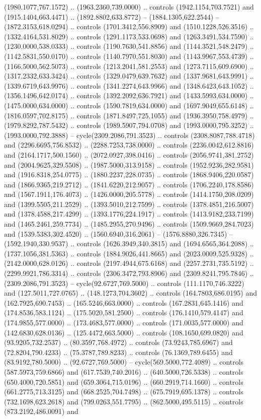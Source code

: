 (1980.1077,767.1572) .. (1963.2360,739.0000) .. controls (1942.1154,703.7521) and (1915.1404,663.4471) .. (1892.8802,633.8772) -- (1884.1305,622.2544) -- (1872.3153,618.0294) .. controls (1701.3412,556.8909) and (1510.1228,526.3516) .. (1332.4164,531.8029) .. controls (1291.1173,533.0698) and (1263.3491,534.7590) .. (1230.0000,538.0333) .. controls (1190.7630,541.8856) and (1144.3521,548.2479) .. (1142.5831,550.0170) .. controls (1140.7970,551.8030) and (1143.9967,553.4739) .. (1166.5000,562.5073) .. controls (1213.2041,581.2553) and (1273.7115,609.6900) .. (1317.2332,633.3424) .. controls (1329.0479,639.7632) and (1337.9681,643.9991) .. (1339.6719,643.9976) .. controls (1341.2274,643.9966) and (1348.6423,643.1052) .. (1356.1496,642.0174) .. controls (1392.2092,636.7921) and (1433.5993,634.0000) .. (1475.0000,634.0000) .. controls (1590.7819,634.0000) and (1697.9049,655.6148) .. (1816.0597,702.8175) .. controls (1871.8497,725.1055) and (1936.3950,758.4979) .. (1979.8292,787.5432) .. controls (1989.5907,794.0708) and (1993.0000,795.3252) .. (1993.0000,792.3888) -- cycle(2309.2086,791.3523) .. controls (2308.8087,788.4718) and (2296.6695,756.8532) .. (2288.7253,738.0000) .. controls (2236.0042,612.8816) and (2164.1717,500.1560) .. (2072.0927,398.0416) .. controls (2056.9741,381.2752) and (2004.9625,329.5508) .. (1987.5000,313.9158) .. controls (1952.9236,282.9581) and (1916.8318,254.0775) .. (1880.2237,228.0735) .. controls (1868.9406,220.0587) and (1866.9365,219.2712) .. (1841.6220,212.9057) .. controls (1706.2240,178.8586) and (1567.1911,176.4073) .. (1426.0000,205.5778) .. controls (1414.1750,208.0209) and (1399.5505,211.2529) .. (1393.5010,212.7599) .. controls (1378.4851,216.5007) and (1378.4588,217.4299) .. (1393.1776,224.1917) .. controls (1413.9182,233.7199) and (1465.2461,259.7734) .. (1485.2955,270.9496) .. controls (1509.9669,284.7023) and (1539.5383,302.4520) .. (1560.6940,316.2061) -- (1576.8880,326.7345) -- (1592.1940,330.9537) .. controls (1626.3949,340.3815) and (1694.6565,364.2088) .. (1737.1056,381.5363) .. controls (1884.9026,441.8665) and (2023.0009,525.9328) .. (2142.0000,628.0126) .. controls (2197.4944,675.6168) and (2257.2731,735.5192) .. (2299.9921,786.3314) .. controls (2306.3472,793.8906) and (2309.8241,795.7846) .. (2309.2086,791.3523) -- cycle(92.6727,769.5000) .. controls (111.1170,746.3222) and (127.5011,727.0765) .. (148.1273,704.3602) .. controls (164.7803,686.0195) and (162.7925,690.7453) .. (165.5246,663.0000) .. controls (167.2831,645.1416) and (174.8536,583.1124) .. (175.5020,581.2500) .. controls (176.1410,579.4147) and (174.9855,577.0000) .. (173.4683,577.0000) .. controls (171.0035,577.0000) and (142.6830,628.0136) .. (125.4472,663.5000) .. controls (108.1650,699.0820) and (93.9205,732.2537) .. (80.3597,768.4972) .. controls (73.9243,785.6967) and (72.8204,790.4233) .. (75.3787,789.8233) .. controls (76.1369,789.6455) and (83.9192,780.5000) .. (92.6727,769.5000) -- cycle(569.5000,772.4089) .. controls (587.5973,759.6866) and (617.7539,740.2016) .. (640.5000,726.5338) .. controls (650.4000,720.5851) and (659.3064,715.0196) .. (660.2919,714.1660) .. controls (661.2775,713.3125) and (668.2525,704.7498) .. (675.7919,695.1378) .. controls (732.1698,623.2618) and (799.0263,551.7795) .. (862.5000,495.5115) .. controls (873.2192,486.0091) and 